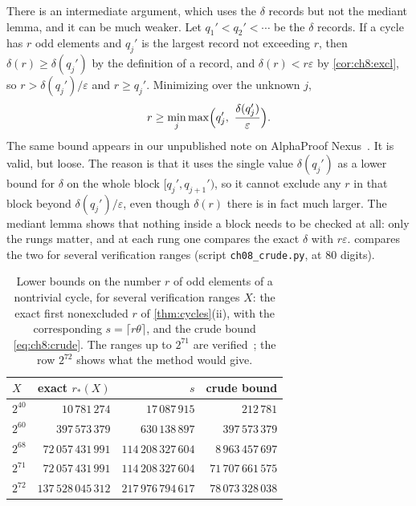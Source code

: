 There is an intermediate argument, which uses the $\delta$ records but not
the mediant lemma, and it can be much weaker. Let
$q_1'<q_2'<\cdots$ be the $\delta$ records. If a cycle has $r$ odd elements
and $q_j'$ is the largest record not exceeding $r$, then
$\delta(r)\geq\delta(q_j')$ by the definition of a record, and
$\delta(r)<r\varepsilon$ by \cref{cor:ch8:excl}, so $r>\delta(q_j')/\varepsilon$
and $r\geq q_j'$. Minimizing over the unknown $j$,
\begin{equation}\label{eq:ch8:crude}
  r\geq\min_j\max\Bigl(q_j',\ \frac{\delta(q_j')}{\varepsilon}\Bigr).
\end{equation}
The same bound appears in our unpublished note on AlphaProof
Nexus~\cite{polsonsokolov2026nexus}. It is valid, but loose. The reason is that
it uses the single value $\delta(q_j')$ as a lower bound for $\delta$ on the
whole block $[q_j',q_{j+1}')$, so it cannot exclude any $r$ in that block
beyond $\delta(q_j')/\varepsilon$, even though $\delta(r)$ there is in fact
much larger. The mediant lemma shows that nothing inside a block needs to be
checked at all: only the rungs matter, and at each rung one compares the exact
$\delta$ with $r\varepsilon$.  compares the two for
several verification ranges (script \texttt{ch08\_crude.py}, at $80$ digits).

\begin{table}[ht]
\centering
\caption{Lower bounds on the number $r$ of odd elements of a nontrivial cycle,
for several verification ranges $X$: the exact first nonexcluded $r$ of
\cref{thm:cycles}(ii), with the corresponding $s=\lceil r\theta\rceil$, and
the crude bound \eqref{eq:ch8:crude}. The ranges up to $2^{71}$ are
verified~\cite{barina2021,barina2025}; the row $2^{72}$ shows what the method would give.}
\label{tab:ch8:crude}
\small
\begin{tabular}{@{}lrrr@{}}
\toprule
$X$ & exact $r_*(X)$ & $s$ & crude bound \\
\midrule
$2^{40}$ & $10\,781\,274$ & $17\,087\,915$ & $212\,781$ \\
$2^{60}$ & $397\,573\,379$ & $630\,138\,897$ & $397\,573\,379$ \\
$2^{68}$ & $72\,057\,431\,991$ & $114\,208\,327\,604$ & $8\,963\,457\,697$ \\
$2^{71}$ & $72\,057\,431\,991$ & $114\,208\,327\,604$ & $71\,707\,661\,575$ \\
$2^{72}$ & $137\,528\,045\,312$ & $217\,976\,794\,617$ & $78\,073\,328\,038$ \\
\bottomrule
\end{tabular}
\end{table}

